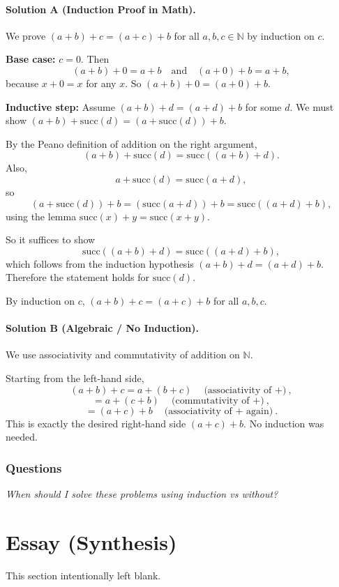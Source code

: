 \documentclass[11pt]{article}
\begin{document}
\paragraph{Solution A (Induction Proof in Math).}
We prove $(a+b)+c = (a+c)+b$ for all $a,b,c \in \mathbb{N}$ by induction on $c$.

\textbf{Base case:} $c=0$.  
Then
\[
(a+b)+0 = a+b
\quad\text{and}\quad
(a+0)+b = a+b,
\]
because $x+0=x$ for any $x$.  
So $(a+b)+0 = (a+0)+b$.

\textbf{Inductive step:} Assume $(a+b)+d = (a+d)+b$ for some $d$.  
We must show $(a+b)+\mathrm{succ}(d) = (a+\mathrm{succ}(d))+b$.

By the Peano definition of addition on the right argument,
\[
(a+b)+\mathrm{succ}(d) = \mathrm{succ}((a+b)+d).
\]
Also,
\[
a+\mathrm{succ}(d) = \mathrm{succ}(a+d),
\]
so
\[
(a+\mathrm{succ}(d))+b 
= (\mathrm{succ}(a+d))+b 
= \mathrm{succ}((a+d)+b),
\]
using the lemma $\mathrm{succ}(x)+y = \mathrm{succ}(x+y)$.

So it suffices to show
\[
\mathrm{succ}((a+b)+d) = \mathrm{succ}((a+d)+b),
\]
which follows from the induction hypothesis $(a+b)+d = (a+d)+b$.  
Therefore the statement holds for $\mathrm{succ}(d)$.

By induction on $c$, $(a+b)+c = (a+c)+b$ for all $a,b,c$.

\paragraph{Solution B (Algebraic / No Induction).}
We use associativity and commutativity of addition on $\mathbb{N}$.

Starting from the left-hand side,
\[
(a+b)+c = a+(b+c)
\quad\text{(associativity of $+$)},
\]
\[
= a+(c+b)
\quad\text{(commutativity of $+$)},
\]
\[
= (a+c)+b
\quad\text{(associativity of $+$ again)}.
\]
This is exactly the desired right-hand side $(a+c)+b$.  
No induction was needed.

\subsubsection{Questions}
\emph{When should I solve these problems using induction vs without?}

\section{Essay (Synthesis)}
This section intentionally left blank.
\end{document}
